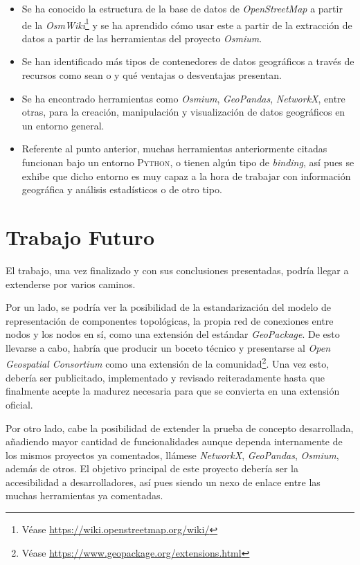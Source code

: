 \begin{itemize}
	\setlength\itemsep{0em}
	\item Se ha conocido la estructura de la base de datos de \textit{OpenStreetMap} a partir de la \textit{OsmWiki}\footnote{Véase \url{https://wiki.openstreetmap.org/wiki/}} y se ha aprendido cómo usar este a partir de la extracción de datos a partir de las herramientas del proyecto \textit{Osmium}.
	
	\item Se han identificado más tipos de contenedores de datos geográficos a través de recursos como sean \autocite{volaya} o \autocite{bolstad} y qué ventajas o desventajas presentan.
	
	\item Se ha encontrado herramientas como \textit{Osmium}, \textit{GeoPandas}, \textit{NetworkX}, entre otras, para la creación, manipulación y visualización de datos geográficos en un entorno general.
	
	\item Referente al punto anterior, muchas herramientas anteriormente citadas funcionan bajo un entorno \textsc{Python}, o tienen algún tipo de \textit{binding}, así pues se exhibe que dicho entorno es muy capaz a la hora de trabajar con información geográfica y análisis estadísticos o de otro tipo.
\end{itemize}

\section{Trabajo Futuro}
El trabajo, una vez finalizado y con sus conclusiones presentadas, podría llegar a extenderse por varios caminos.

Por un lado, se podría ver la posibilidad de la estandarización del modelo de representación de componentes topológicas, la propia red de conexiones entre nodos y los nodos en sí, como una extensión del estándar \textit{GeoPackage}. De esto llevarse a cabo, habría que producir un boceto técnico y presentarse al \textit{Open Geospatial Consortium} como una extensión de la comunidad\footnote{Véase \url{https://www.geopackage.org/extensions.html}}. Una vez esto, debería ser publicitado, implementado y revisado reiteradamente hasta que finalmente acepte la madurez necesaria para que se convierta en una extensión oficial.

Por otro lado, cabe la posibilidad de extender la prueba de concepto desarrollada, añadiendo mayor cantidad de funcionalidades aunque dependa internamente de los mismos proyectos ya comentados, llámese \textit{NetworkX}, \textit{GeoPandas}, \textit{Osmium}, además de otros. El objetivo principal de este proyecto debería ser la accesibilidad a desarrolladores, así pues siendo un nexo de enlace entre las muchas herramientas ya comentadas.

